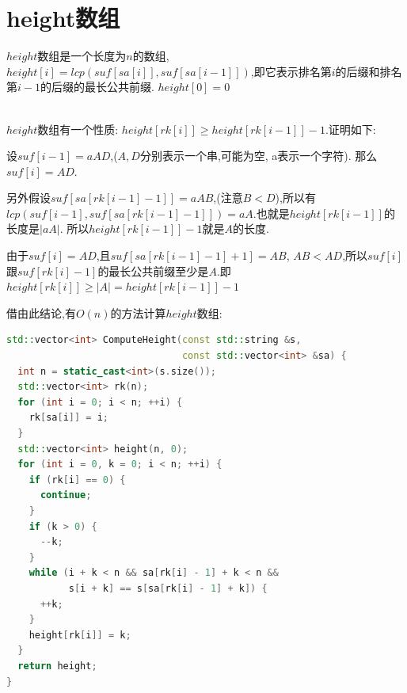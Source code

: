 \documentclass{article}
\begin{document}
\section{height数组}
$height$数组是一个长度为$n$的数组, $height[i]=lcp(suf[sa[i]], suf[sa[i - 1]])$,即它表示排名第$i$的后缀和排名第$i-1$的后缀的最长公共前缀. $height[0]=0$ \par
~\\
$height$数组有一个性质: $height[rk[i]] \geq height[rk[i-1]]-1$.证明如下: \par
设$suf[i-1]=aAD$,($A,D$分别表示一个串,可能为空, a表示一个字符). 那么$suf[i]=AD$. \par 另外假设$suf[sa[rk[i-1]-1]]=aAB$,(注意$B < D$),所以有$lcp(suf[i-1], suf[sa[rk[i-1]-1]])=aA$.也就是$height[rk[i-1]]$的长度是$|aA|$. 所以$height[rk[i-1]]-1$就是$A$的长度. \par
由于$suf[i]=AD$,且$suf[sa[rk[i-1]-1]+1]=AB$, $AB < AD$,所以$suf[i]$跟$suf[rk[i]-1]$的最长公共前缀至少是$A$.即$height[rk[i]] \geq |A| = height[rk[i-1]]-1$ \par
借由此结论,有$O(n)$的方法计算$height$数组: \par
\begin{lstlisting}[language=C++, caption={ComputeHeight}]
std::vector<int> ComputeHeight(const std::string &s,
                               const std::vector<int> &sa) {
  int n = static_cast<int>(s.size());
  std::vector<int> rk(n);
  for (int i = 0; i < n; ++i) {
    rk[sa[i]] = i;
  }
  std::vector<int> height(n, 0);
  for (int i = 0, k = 0; i < n; ++i) {
    if (rk[i] == 0) {
      continue;
    }
    if (k > 0) {
      --k;
    }
    while (i + k < n && sa[rk[i] - 1] + k < n &&
           s[i + k] == s[sa[rk[i] - 1] + k]) {
      ++k;
    }
    height[rk[i]] = k;
  }
  return height;
}
\end{lstlisting}
\end{document}
